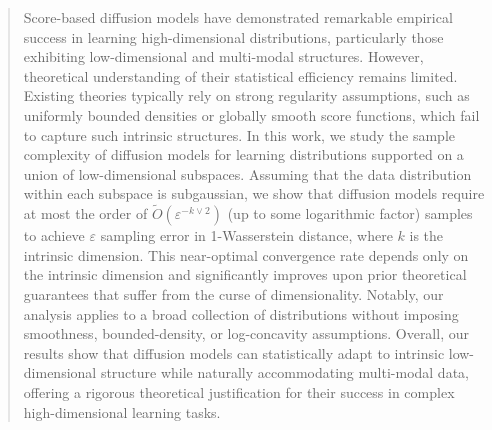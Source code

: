\documentclass{article}
\theoremstyle{plain}
\theoremstyle{remark}
\begin{document}

\printAffiliationsAndNotice{}

\begin{abstract}
Score-based diffusion models have demonstrated remarkable empirical success in learning high-dimensional distributions, particularly those exhibiting low-dimensional and multi-modal structures. However, theoretical understanding of their statistical efficiency remains limited. Existing theories typically rely on strong regularity assumptions, such as uniformly bounded densities or globally smooth score functions, which fail to capture such intrinsic structures.
In this work, we study the sample complexity of diffusion models for learning distributions supported on a union of low-dimensional subspaces. Assuming that the data distribution within each subspace is subgaussian, we show that diffusion models require at most the order of $\widetilde{O}(\varepsilon^{-k \vee 2})$ (up to some logarithmic factor) samples to achieve $\varepsilon$ sampling error in 1-Wasserstein distance, where $k$ is the intrinsic dimension.
This near-optimal convergence rate depends only on the intrinsic dimension and significantly improves upon prior theoretical guarantees that suffer from the curse of dimensionality. Notably, our analysis applies to a broad collection of distributions without imposing smoothness, bounded-density, or log-concavity assumptions.
Overall, our results show that diffusion models can statistically adapt to intrinsic low-dimensional structure while naturally accommodating multi-modal data, offering a rigorous theoretical justification for their success in complex high-dimensional learning tasks.
\end{abstract}
\end{document}
